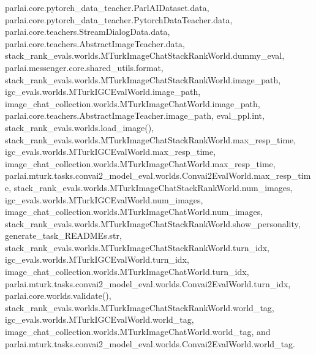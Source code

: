 parlai.\+core.\+pytorch\+\_\+data\+\_\+teacher.\+Parl\+A\+I\+Dataset.\+data, parlai.\+core.\+pytorch\+\_\+data\+\_\+teacher.\+Pytorch\+Data\+Teacher.\+data, parlai.\+core.\+teachers.\+Stream\+Dialog\+Data.\+data, parlai.\+core.\+teachers.\+Abstract\+Image\+Teacher.\+data, stack\+\_\+rank\+\_\+evals.\+worlds.\+M\+Turk\+Image\+Chat\+Stack\+Rank\+World.\+dummy\+\_\+eval, parlai.\+messenger.\+core.\+shared\+\_\+utils.\+format, stack\+\_\+rank\+\_\+evals.\+worlds.\+M\+Turk\+Image\+Chat\+Stack\+Rank\+World.\+image\+\_\+path, igc\+\_\+evals.\+worlds.\+M\+Turk\+I\+G\+C\+Eval\+World.\+image\+\_\+path, image\+\_\+chat\+\_\+collection.\+worlds.\+M\+Turk\+Image\+Chat\+World.\+image\+\_\+path, parlai.\+core.\+teachers.\+Abstract\+Image\+Teacher.\+image\+\_\+path, eval\+\_\+ppl.\+int, stack\+\_\+rank\+\_\+evals.\+worlds.\+load\+\_\+image(), stack\+\_\+rank\+\_\+evals.\+worlds.\+M\+Turk\+Image\+Chat\+Stack\+Rank\+World.\+max\+\_\+resp\+\_\+time, igc\+\_\+evals.\+worlds.\+M\+Turk\+I\+G\+C\+Eval\+World.\+max\+\_\+resp\+\_\+time, image\+\_\+chat\+\_\+collection.\+worlds.\+M\+Turk\+Image\+Chat\+World.\+max\+\_\+resp\+\_\+time, parlai.\+mturk.\+tasks.\+convai2\+\_\+model\+\_\+eval.\+worlds.\+Convai2\+Eval\+World.\+max\+\_\+resp\+\_\+time, stack\+\_\+rank\+\_\+evals.\+worlds.\+M\+Turk\+Image\+Chat\+Stack\+Rank\+World.\+num\+\_\+images, igc\+\_\+evals.\+worlds.\+M\+Turk\+I\+G\+C\+Eval\+World.\+num\+\_\+images, image\+\_\+chat\+\_\+collection.\+worlds.\+M\+Turk\+Image\+Chat\+World.\+num\+\_\+images, stack\+\_\+rank\+\_\+evals.\+worlds.\+M\+Turk\+Image\+Chat\+Stack\+Rank\+World.\+show\+\_\+personality, generate\+\_\+task\+\_\+\+R\+E\+A\+D\+M\+Es.\+str, stack\+\_\+rank\+\_\+evals.\+worlds.\+M\+Turk\+Image\+Chat\+Stack\+Rank\+World.\+turn\+\_\+idx, igc\+\_\+evals.\+worlds.\+M\+Turk\+I\+G\+C\+Eval\+World.\+turn\+\_\+idx, image\+\_\+chat\+\_\+collection.\+worlds.\+M\+Turk\+Image\+Chat\+World.\+turn\+\_\+idx, parlai.\+mturk.\+tasks.\+convai2\+\_\+model\+\_\+eval.\+worlds.\+Convai2\+Eval\+World.\+turn\+\_\+idx, parlai.\+core.\+worlds.\+validate(), stack\+\_\+rank\+\_\+evals.\+worlds.\+M\+Turk\+Image\+Chat\+Stack\+Rank\+World.\+world\+\_\+tag, igc\+\_\+evals.\+worlds.\+M\+Turk\+I\+G\+C\+Eval\+World.\+world\+\_\+tag, image\+\_\+chat\+\_\+collection.\+worlds.\+M\+Turk\+Image\+Chat\+World.\+world\+\_\+tag, and parlai.\+mturk.\+tasks.\+convai2\+\_\+model\+\_\+eval.\+worlds.\+Convai2\+Eval\+World.\+world\+\_\+tag.

